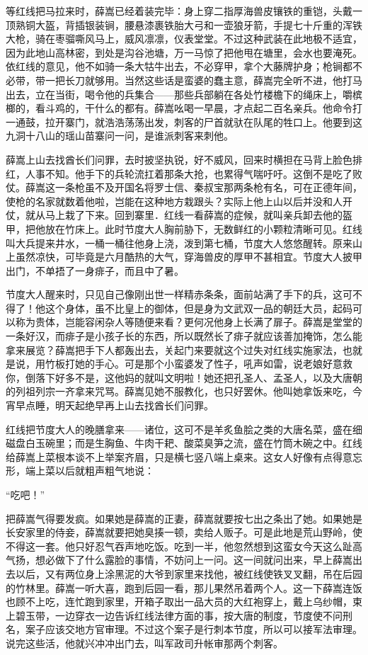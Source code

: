 等红线把马拉来时，薛嵩已经着装完毕：身上穿二指厚海兽皮镶铁的重铠，头戴一顶熟铜大盔，背插银装锏，腰悬漆裹铁胎大弓和一壶狼牙箭，手提七十斤重的浑铁大枪，骑在枣骝嘶风马上，威风凛凛，仪表堂堂。不过这种武装在此地极不适宜，因为此地山高林密，到处是沟谷池塘，万一马惊了把他甩在塘里，会水也要淹死。依红线的意见，他不如骑一条大牯牛出去，不必穿甲，拿个大藤牌护身；枪锏都不必带，带一把长刀就够用。当然这些话是蛮婆的蠢主意，薛嵩完全听不进，他打马出去，立在当街，喝令他的兵集合——那些兵部躺在各处竹楼檐下的绳床上，嚼槟榔的，看斗鸡的，干什么的都有。薛嵩吆喝一早晨，才点起二百名亲兵。他命令打一通鼓，拉开寨门，就浩浩荡荡出发，刺客的尸首就驮在队尾的牲口上。他要到这九洞十八山的瑶山苗寨问一问，是谁派刺客来刺他。 

薛嵩上山去找酋长们问罪，去时披坚执锐，好不威风，回来时横担在马背上脸色排红，人事不知。他手下的兵轮流扛着那条大抢，也累得气喘吁吁。这倒不是吃了败仗。薛嵩这一条枪虽不及开国名将罗士信、秦叔宝那两条枪有名，可在正德年间，使枪的名家就数着他啦，岂能在这种地方栽跟头？实际上他上山以后并没和人开仗，就从马上栽了下来。回到寨里．红线一看薛嵩的症候，就叫亲兵卸去他的盔甲，把他放在竹床上。此时节度大人胸前胁下，无数鲜红的小颗粒清晰可见。红线叫大兵提来井水，一桶一桶往他身上浇，泼到第七桶，节度大人悠悠醒转。原来山上虽然凉快，可毕竟是六月酷热的大气，穿海兽皮的厚甲不甚相宜。节度大人披甲出门，不单捂了一身痱子，而且中了暑。 

节度大人醒来时，只见自己像刚出世一样精赤条条，面前站满了手下的兵，这可不得了！他这个身体，虽不比皇上的御体，但是身为文武双一品的朝廷大员，起码可以称为贵体，岂能容闲杂人等随便来看？更何况他身上长满了扉子。薛嵩是堂堂的一条好汉，而痱子是小孩子长的东西，所以既然长了痱子就应该善加掩饰，怎么能拿来展览？薛嵩把手下人都轰出去，关起门来要就这个过失对红线实施家法，也就是说，用竹板打她的手心。可是那个小蛮婆发了性子，吼声如雷，说老娘好意救你，倒落下好多不是，这他妈的就叫文明啦！她还把孔圣人、孟圣人，以及大唐朝的列祖列宗一齐拿来咒骂。薛嵩见她不服教化，也只好罢休。他叫她拿饭来吃，今宵早点睡，明天起绝早再上山去找酋长们问罪。 

红线把节度大人的晚膳拿来——诸位，这可不是羊炙鱼脍之类的大唐名菜，盛在细磁盘白玉碗里；而是生胸鱼、牛肉干耙、酸菜臭笋之流，盛在竹筒木碗之中。红线给薛嵩上菜根本谈不上举案齐眉，只是横七竖八端上桌来。这女人好像有点得意忘形，端上菜以后就粗声粗气地说： 

“吃吧！” 

把薛嵩气得要发疯。如果她是薛嵩的正妻，薛嵩就要按七出之条出了她。如果她是长安家里的侍妾，薛嵩就要把她臭揍一顿，卖给人贩子。可是此地是荒山野岭，使不得这一套。他只好忍气吞声地吃饭。吃到一半，他忽然想到这蛮女今天这么趾高气扬，想必做下了什么露脸的事情，不妨问上一问。这一间就问出来，早上薛嵩出去以后，又有两位身上涂黑泥的大爷到家里来找他，被红线使铁叉叉翻，吊在后园的竹林里。薛嵩一听大喜，跑到后园一看，那儿果然吊着两个人。这一下薛嵩连饭也顾不上吃，连忙跑到家里，开箱子取出一品大员的大红袍穿上，戴上乌纱帽，束上碧玉带，一边穿衣一边告诉红线法律方面的事，按大唐的制度，节度使不问刑名，案子应该交地方官审理。不过这个案子是行刺本节度，所以可以接军法审理。说完这些活，他就兴冲冲出门去，叫军政司升帐审那两个刺客。 

